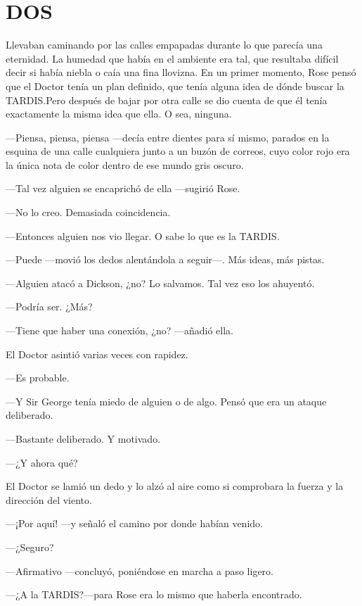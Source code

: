 \chapter*{DOS}

{Llevaban caminando por las calles empapadas durante lo que parecía una
	eternidad. La humedad que había en el ambiente era tal, que resultaba
	difícil decir si había niebla o caía una fina llovizna. En un primer
	momento, Rose pensó que el Doctor tenía un plan definido, que tenía
	alguna idea de dónde buscar la TARDIS.\@ Pero después de bajar por otra
	calle se dio cuenta de que él tenía exactamente la misma idea que ella.
O sea, ninguna.}

{---Piensa, piensa, piensa ---decía entre dientes para sí mismo, parados
	en la esquina de una calle cualquiera junto a un buzón de correos, cuyo
color rojo era la única nota de color dentro de ese mundo gris oscuro.}

{---Tal vez alguien se encaprichó de ella ---sugirió Rose.}

{---No lo creo. Demasiada coincidencia.}

{---Entonces alguien nos vio llegar. O sabe lo que es la TARDIS.}

{---Puede ---movió los dedos alentándola a seguir---. Más ideas, más
pistas.}

{---Alguien atacó a Dickson, ¿no? Lo salvamos. Tal vez eso los
ahuyentó.}

{---Podría ser. ¿Más?}

{---Tiene que haber una conexión, ¿no? ---añadió ella.}

{El Doctor asintió varias veces con rapidez.}

{---Es probable.}

{---Y Sir George tenía miedo de alguien o de algo. Pensó que era un
ataque deliberado.}

{---Bastante deliberado. Y motivado.}

{---¿Y ahora qué?}

{El Doctor se lamió un dedo y lo alzó al aire como si comprobara la
fuerza y la dirección del viento.}

{---¡Por aquí! ---y señaló el camino por donde habían venido.}

{---¿Seguro?}

{---Afirmativo ---concluyó, poniéndose en marcha a paso ligero.}

{---¿A la TARDIS?\@ ---para Rose era lo mismo que haberla encontrado.}

